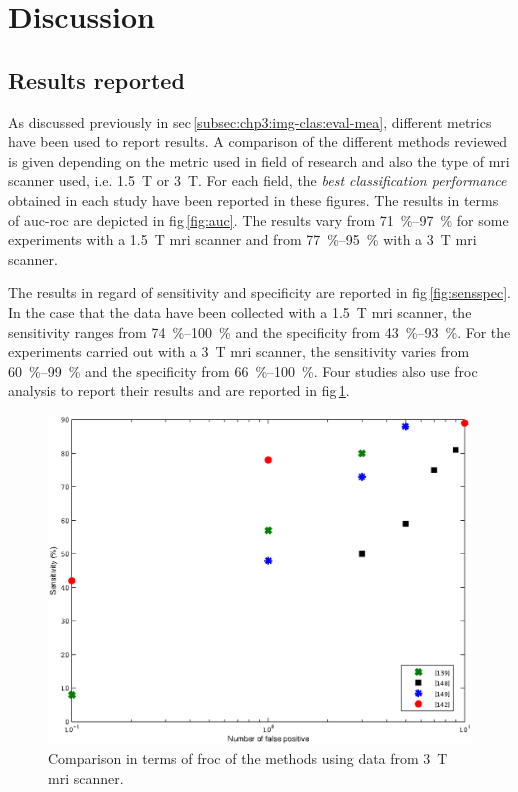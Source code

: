 \section{Discussion}\label{sec:chp3:dis}


\subsection{Results reported}\label{subsec:chp3:dis:res}

As discussed previously in \ac{sec}\,\ref{subsec:chp3:img-clas:eval-mea}, different metrics have been used to report results.
A comparison of the different methods reviewed is given depending on the metric used in field of research and also the type of \ac{mri} scanner used, i.e. \SI{1.5}{\tesla} or \SI{3}{\tesla}.
For each field, the \textit{best classification performance} obtained in each study have been reported in these figures.
The results in terms of \ac{auc}-\ac{roc} are depicted in \acs{fig}\,\ref{fig:auc}.
The results vary from \SIrange{71}{97}{\percent} for some experiments with a \SI{1.5}{\tesla} \ac{mri} scanner and from \SIrange{77}{95}{\percent} with a \SI{3}{\tesla} \ac{mri} scanner. 

The results in regard of sensitivity and specificity are reported in \acs{fig}\,\ref{fig:sensspec}.
In the case that the data have been collected with a \SI{1.5}{\tesla} \ac{mri} scanner, the sensitivity ranges from \SIrange{74}{100}{\percent} and the specificity from \SIrange{43}{93}{\percent}.
For the experiments carried out with a \SI{3}{\tesla} \ac{mri} scanner, the sensitivity varies from \SIrange{60}{99}{\percent} and the specificity from \SIrange{66}{100}{\percent}.
Four studies also use \ac{froc} analysis to report their results and are reported in \ac{fig}\,\ref{fig:froc}.

\begin{figure}
  \centering
  \includegraphics[width=.8\linewidth]{3_review/figures/results/froc.eps}
  \caption{Comparison in terms of \acs*{froc} of the methods using data from \SI{3}{\tesla} \acs*{mri} scanner.}
  \label{fig:froc}
\end{figure}

